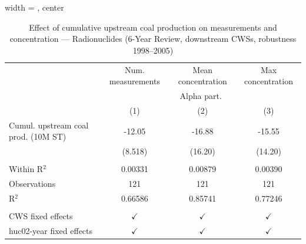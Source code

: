 
\begin{table}[htbp]
   
   \caption{\label{tab:6yr_huc02fe_cnt_radio_2005} Effect of cumulative upstream coal production on measurements and concentration --- Radionuclides (6-Year Review, downstream CWSs, robustness 1998--2005)}
   \bigskip
   
   \centering
   
   \begin{adjustbox}{width = \textwidth, center}
      
      
      \begin{tabular}{lccc}
         \toprule
         
                                             & Num. measurements & Mean concentration & Max concentration\\  
         
          & \multicolumn{3}{c}{Alpha part.} \\ 
         
                                             & (1)               & (2)                & (3)\\  
         
         \midrule 
         Cumul. upstream coal prod. (10M ST) & -12.05            & -16.88             & -15.55\\   
                                             & (8.518)           & (16.20)            & (14.20)\\   
         
          \\
         
         Within R$^2$                        & 0.00331           & 0.00879            & 0.00390\\  
         Observations                        & 121               & 121                & 121\\  
         R$^2$                               & 0.66586           & 0.85741            & 0.77246\\  
         
          \\
         
         CWS fixed effects                   & $\checkmark$      & $\checkmark$       & $\checkmark$\\   
         huc02-year fixed effects            & $\checkmark$      & $\checkmark$       & $\checkmark$\\   
         

\end{tabular}
\end{adjustbox}
\end{table}
